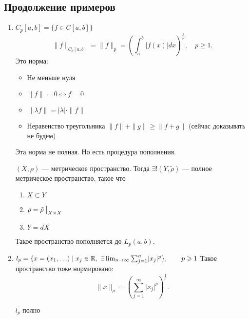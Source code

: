 % 
% 

\subsection{Продолжение примеров}
\begin{enumerate}
    \item $ C_p[a, b] = \{f \in  C[a, b]\}$
	\[
	    \|f\|_{C_p[a, b]} = \|f\|_p = \left( \int_{a}^{b} \left| f(x) \right| dx  \right) ^{\frac{1}{p}}, \quad p \ge 1
	.\]
	Это норма:
	\begin{itemize}
	    \item Не меньше нуля
	    \item $ \|f\| = 0 \Longleftrightarrow f = 0$
	    \item $ \| \lambda f \|  = \lvert \lambda  \rvert \cdot  \|f\|$
	    \item Неравенство треугольника $ \|f\| + \| g\| \ge \|f + g\|$ (сейчас доказывать не будем)
	\end{itemize}
	Эта норма не полная.
	Но есть процедура {\sf пополнения}.
	\begin{thm}
	    $ (X, \rho)$ ---  метрическое пространство. Тогда $\exists ! (Y, \tilde\rho)$  --- полное метрическое пространство, такое что
	    \begin{enumerate}[noitemsep]
		\item $X \subset  Y $
		\item $ \rho = \tilde \rho \bigm |_{X \times X}$
		\item $ Y = dX$
	    \end{enumerate}
	\end{thm}
	Такое пространство пополняется до $ L_p(a, b)$.
    \item $ l_p = \{x= (x_1, \ldots ) \mid x_j \in  \mathbb{R}, ~ \exists  \lim_{n \to \infty} \sum_{j=1}^{n}\lvert x_j \rvert ^{p} \}, \qquad p \geqslant 1$
	Такое пространство тоже нормировано:
	\[
	    \| x\|_{\rho} = \left( \sum_{j=1}^{\infty}\lvert x_j \rvert ^{p} \right) ^{\frac{1}{p}}
	.\]
	\begin{prac}
	    $ l_p$ полно
	\end{prac}
\end{enumerate}

